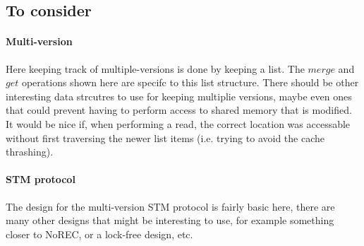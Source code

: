 \documentclass[11pt,letterpaper]{article}
\begin{document}
\subsection{To consider}
\paragraph{Multi-version}
Here keeping track of multiple-versions is done by keeping a list.
The $\mathit{merge}$ and $\mathit{get}$ operations shown here are specifc to this list structure.
There should be other interesting data strcutres to use for keeping multiplie versions, maybe
even ones that could prevent having to perform access to shared memory that is modified.
It would be nice if, when performing a read, the correct location was accessable without first traversing the newer
list items (i.e. trying to avoid the cache thrashing).

\paragraph{STM protocol}
The design for the multi-version STM protocol is fairly basic here, there are many other designs that might
be interesting to use, for example something closer to NoREC, or
a lock-free design, etc.
\end{document}
